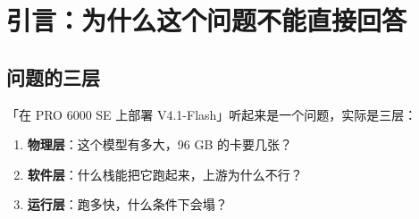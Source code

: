 \begin{abstract}
第四项是\textbf{瓶颈不在带宽也不在功耗，在软件与互连}。三条独立证据：128K 预填时 GPU 只吃 220 W / 600 W；600 W300 W 单用户仅损约 4\%；4 卡预填只比 8 卡低 13\%。上游 vLLM 在 SM120 上因 DeepGEMM 缺 SM120 支持而\textbf{起不来}，SGLang 官方硬件矩阵不含 SM120 且该模型未进 release。 {\scriptsize\texttt{[c-\hspace{0pt}upstream-\hspace{0pt}vllm-\hspace{0pt}blocked]}} {\scriptsize\texttt{[c-\hspace{0pt}sglang-\hspace{0pt}no-\hspace{0pt}sm120]}}


第五项是\textbf{测量本身会骗人}。流传的「1040K 上下文 74.5 秒（13,962 tok/s）」是前缀缓存命中造成的假象，实际只预填了约 140K；真实冷预填是 310.5 秒。同类假象在作者自己的两组数据里都出现过。 {\scriptsize\texttt{[c-\hspace{0pt}cache-\hspace{0pt}artifact]}}


最后一项是\textbf{代价的定位}：官方 API 输出 \$1.2/百万 token、并发上限 2,500，而单机 8 并发实测 468 tok/s；第三方盈亏平衡点是 14,650 tok/s。差两个数量级，故自建的理由是数据主权与可定制，不是省钱。 {\scriptsize\texttt{[c-\hspace{0pt}selfhost-\hspace{0pt}breakeven]}} {\scriptsize\texttt{[c-\hspace{0pt}selfhost-\hspace{0pt}for-\hspace{0pt}control]}}


\textbf{关键词}：RTX PRO 6000；Server Edition；SM120；DeepSeek-V4.1-Flash；MoE 部署；显存算术；DSpark；证据等级



\end{abstract}
\section{引言：为什么这个问题不能直接回答}

\subsection{问题的三层}

「在 PRO 6000 SE 上部署 V4.1-Flash」听起来是一个问题，实际是三层：


\begin{enumerate}
  \item \textbf{物理层}：这个模型有多大，96 GB 的卡要几张？
  \item \textbf{软件层}：什么栈能把它跑起来，上游为什么不行？
  \item \textbf{运行层}：跑多快，什么条件下会塌？
\end{enumerate}

